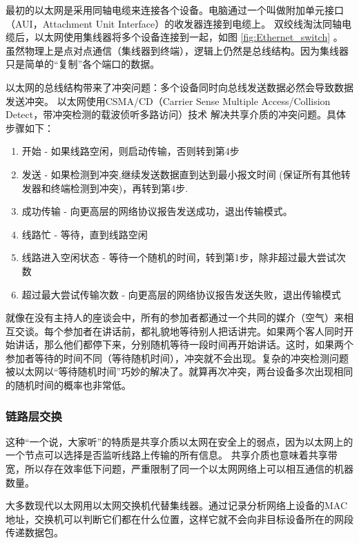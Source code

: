 最初的以太网是采用同轴电缆来连接各个设备。电脑通过一个叫做附加单元接口（AUI，Attachment Unit Interface）的收发器连接到电缆上。
双绞线淘汰同轴电缆后，以太网使用集线器将多个设备连接到一起，如图 \ref{fig:Ethernet_switch} 。
虽然物理上是点对点通信（集线器到终端），逻辑上仍然是总线结构。因为集线器只是简单的“复制”各个端口的数据。


以太网的总线结构带来了冲突问题：多个设备同时向总线发送数据必然会导致数据发送冲突。
以太网使用CSMA/CD（Carrier Sense Multiple Access/Collision Detect，带冲突检测的载波侦听多路访问）技术
解决共享介质的冲突问题。具体步骤如下：

\begin{enumerate}
\item     开始 - 如果线路空闲，则启动传输，否则转到第4步
\item     发送 - 如果检测到冲突,继续发送数据直到达到最小报文时间 (保证所有其他转发器和终端检测到冲突)，再转到第4步.
\item     成功传输 - 向更高层的网络协议报告发送成功，退出传输模式。
\item     线路忙 - 等待，直到线路空闲
\item     线路进入空闲状态 - 等待一个随机的时间，转到第1步，除非超过最大尝试次数
\item     超过最大尝试传输次数 - 向更高层的网络协议报告发送失败，退出传输模式
\end{enumerate}

就像在没有主持人的座谈会中，所有的参加者都通过一个共同的媒介（空气）来相互交谈。每个参加者在讲话前，都礼貌地等待别人把话讲完。如果两个客人同时开始讲话，那么他们都停下来，分别随机等待一段时间再开始讲话。这时，如果两个参加者等待的时间不同（等待随机时间），冲突就不会出现。复杂的冲突检测问题被以太网以“等待随机时间”巧妙的解决了。就算再次冲突，两台设备多次出现相同的随机时间的概率也非常低。

\subsubsection*{链路层交换}

这种“一个说，大家听”的特质是共享介质以太网在安全上的弱点，因为以太网上的一个节点可以选择是否监听线路上传输的所有信息。
共享介质也意味着共享带宽，所以存在效率低下问题，严重限制了同一个以太网网络上可以相互通信的机器数量。

大多数现代以太网用以太网交换机代替集线器。通过记录分析网络上设备的MAC地址，交换机可以判断它们都在什么位置，这样它就不会向非目标设备所在的网段传递数据包。

